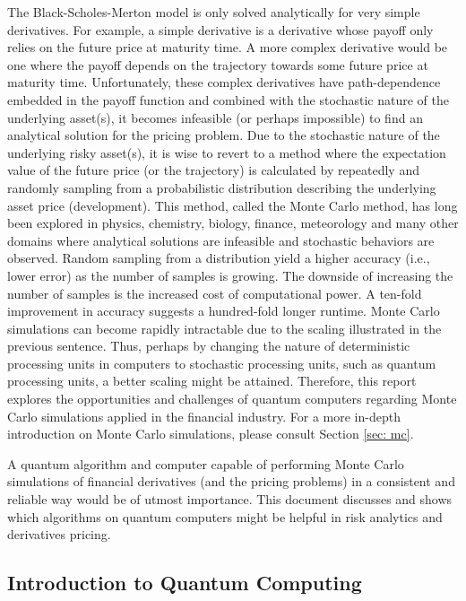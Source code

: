 \documentclass[../main.tex]{subfiles}
\begin{document}
The Black-Scholes-Merton model is only solved analytically for very simple derivatives. For example, a simple derivative is a derivative whose payoff only relies on the future price at maturity time. A more complex derivative would be one where the payoff depends on the trajectory towards some future price at maturity time. Unfortunately, these complex derivatives have path-dependence embedded in the payoff function and combined with the stochastic nature of the underlying asset(s), it becomes infeasible (or perhaps impossible) to find an analytical solution for the pricing problem. Due to the stochastic nature of the underlying risky asset(s), it is wise to revert to a method where the expectation value of the future price (or the trajectory) is calculated by repeatedly and randomly sampling from a probabilistic distribution describing the underlying asset price (development). This method, called the Monte Carlo method, has long been explored in physics, chemistry, biology, finance, meteorology and many other domains where analytical solutions are infeasible and stochastic behaviors are observed. Random sampling from a distribution yield a higher accuracy (i.e., lower error) as the number of samples is growing. The downside of increasing the number of samples is the increased cost of computational power. A ten-fold improvement in accuracy suggests a hundred-fold longer runtime. Monte Carlo simulations can become rapidly intractable due to the scaling illustrated in the previous sentence. Thus, perhaps by changing the nature of deterministic processing units in computers to stochastic processing units, such as quantum processing units, a better scaling might be attained. Therefore, this report explores the opportunities and challenges of quantum computers regarding Monte Carlo simulations applied in the financial industry. For a more in-depth introduction on Monte Carlo simulations, please consult Section \ref{sec: mc}.
\par

A quantum algorithm and computer capable of performing Monte Carlo simulations of financial derivatives (and the pricing problems) in a consistent and reliable way would be of utmost importance. This document discusses and shows which algorithms on quantum computers might be helpful in risk analytics and derivatives pricing.\par

\subsection{Introduction to Quantum Computing} \label{sec: intro_qm}
\end{document}
